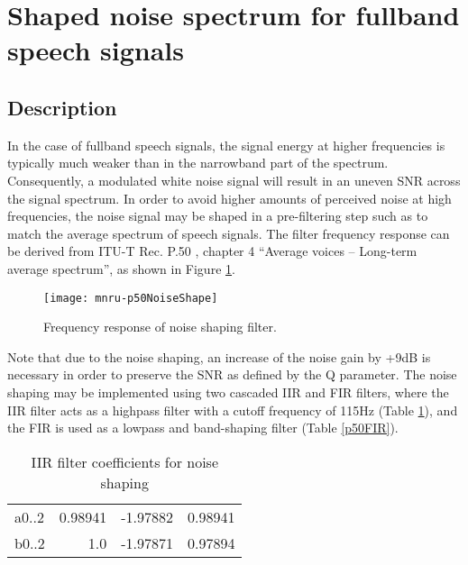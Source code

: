 \section{Shaped noise spectrum for fullband speech signals} \label{fullband}

\subsection {Description}

In the case of fullband speech signals, the signal energy at higher frequencies is typically much weaker than in the
narrowband part of the spectrum.
Consequently, a modulated white noise signal will result in an uneven SNR across the signal spectrum.
In order to avoid higher amounts of perceived noise at high frequencies, the noise signal may be shaped in a
pre-filtering step such as to match the average spectrum of speech signals.
The filter frequency response can be derived from ITU-T Rec. P.50 \cite{P.50}, chapter 4 “Average voices – Long-term
average spectrum”, as shown in Figure \ref{MNRUP50}.

\begin{figure}[ht]
    \begin{center}
        \texttt{[image: mnru-p50NoiseShape]}
    \end{center}
    \caption{Frequency response of noise shaping filter.\label{MNRUP50}}
\end{figure}

Note that due to the noise shaping, an increase of the noise gain by +9dB is necessary in order to preserve the SNR as
defined by the Q parameter.
The noise shaping may be implemented using two cascaded IIR and FIR filters, where the IIR filter acts as a highpass
filter with a cutoff frequency of 115Hz (Table \ref{p50IIR}), and the FIR is used as a lowpass and band-shaping filter
(Table \ref{p50FIR}).

\begin{table}
    \centering
    \begin{tabular}{lrrr}
        a0..2 & 0.98941 & -1.97882 & 0.98941 \\
        b0..2 & 1.0 & -1.97871 & 0.97894 \\

    \end{tabular}
    \caption{IIR filter coefficients for noise shaping}
    \label{p50IIR}
\end{table}


